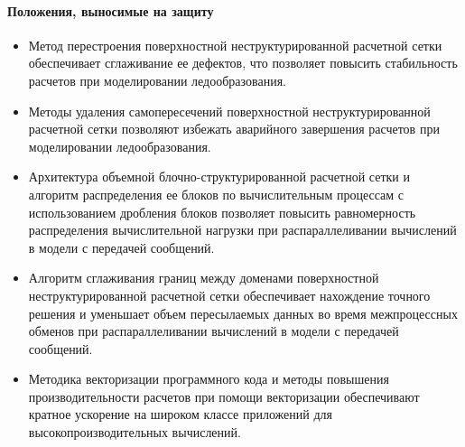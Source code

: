 \paragraph{Положения, выносимые на защиту}
\begin{itemize}[noitemsep,topsep=0pt,parsep=0pt,partopsep=0pt]
\item Метод перестроения поверхностной неструктурированной расчетной сетки обеспечивает сглаживание ее дефектов, что позволяет повысить стабильность расчетов при моделировании ледообразования.
\item Методы удаления самопересечений поверхностной не\-структурированной расчетной сетки позволяют избежать аварийного завершения расчетов при моделировании ледообразования.
\item Архитектура объемной блочно-структурированной расчетной сетки и алгоритм распределения ее блоков по вычислительным процессам с использованием дробления блоков позволяет повысить равномерность распределения вычислительной нагрузки при распараллеливании вычислений в модели с передачей сообщений.
\item Алгоритм сглаживания границ между доменами поверхностной неструктурированной расчетной сетки обеспечивает нахождение точного решения и уменьшает объем пересылаемых данных во время межпроцессных обменов при распараллеливании вычислений в модели с передачей сообщений.
\item Методика векторизации программного кода и методы повышения производительности расчетов при помощи векторизации обеспечивают кратное ускорение на широком классе приложений для высокопроизводительных вычислений.
\end{itemize}